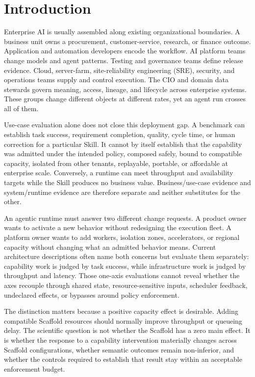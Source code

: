 \documentclass[11pt]{article}
\begin{document}
\section{Introduction}
\label{sec:introduction}

Enterprise AI is usually assembled along existing organizational boundaries. A business unit owns a procurement, customer-service, research, or finance outcome. Application and automation developers encode the workflow. AI platform teams change models and agent patterns. Testing and governance teams define release evidence. Cloud, server-farm, site-reliability engineering (SRE), security, and operations teams supply and control execution. The CIO and domain data stewards govern meaning, access, lineage, and lifecycle across enterprise systems. These groups change different objects at different rates, yet an agent run crosses all of them.

Use-case evaluation alone does not close this deployment gap. A benchmark can establish task success, requirement completion, quality, cycle time, or human correction for a particular Skill. It cannot by itself establish that the capability was admitted under the intended policy, composed safely, bound to compatible capacity, isolated from other tenants, replayable, portable, or affordable at enterprise scale. Conversely, a runtime can meet throughput and availability targets while the Skill produces no business value. Business/use-case evidence and system/runtime evidence are therefore separate and neither substitutes for the other.

An agentic runtime must answer two different change requests. A product owner wants to activate a new behavior without redesigning the execution fleet. A platform owner wants to add workers, isolation zones, accelerators, or regional capacity without changing what an admitted behavior means. Current architecture descriptions often name both concerns but evaluate them separately: capability work is judged by task success, while infrastructure work is judged by throughput and latency. Those one-axis evaluations cannot reveal whether the axes recouple through shared state, resource-sensitive inputs, scheduler feedback, undeclared effects, or bypasses around policy enforcement.

The distinction matters because a positive capacity effect is desirable. Adding compatible Scaffold resources should normally improve throughput or queueing delay. The scientific question is not whether the Scaffold has a zero main effect. It is whether the response to a capability intervention materially changes across Scaffold configurations, whether semantic outcomes remain non-inferior, and whether the controls required to establish that result stay within an acceptable enforcement budget.
\end{document}
